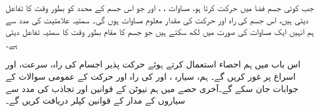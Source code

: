

\quad
جب کوئی جسم فضا میں حرکت کرتا ہو،   مساوات   ، ،  اور   جو اس جسم کے محدد  کو بطور وقت کا تفاعل  دیتی ہیں،  اس جسم کی راہ اور حرکت کی مقدار معلوم مساوات ہوں گی۔ سمتیہ   علامتیت  کی مدد سے ہم انہیں ایک مساوات  کی صورت میں لکھ سکتے ہیں جو  جسم کا مقام بطور وقت کا سمتیہ  تفاعل دیتی ہے۔

اس باب میں  ہم احصاء استعمال کرتے ہوئے حرکت پذیر اجسام کی راہ، سرعت،  اور اسراع پر غور کریں گے۔ ہم،  سیارہ  ، اور   کی راہ اور حرکت کے عمومی سوالات کے جوابات جان سکے گے۔آخری  حصے میں ہم نیوٹن کے قوانین اور    تجاذب کی مدد سے سیاروں کے مدار کے  قوانین کپلر دریافت کریں گے۔ 


